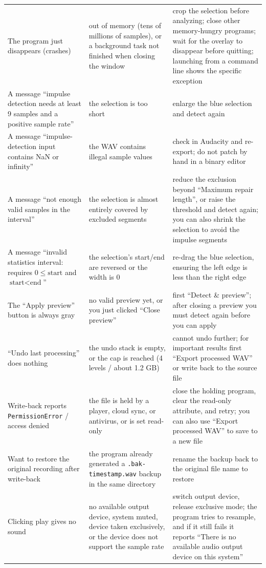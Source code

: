 \documentclass[UTF8,a4paper,12pt]{ctexart}
\begin{document}
{\begin{longtable}{@{}>{\raggedright\arraybackslash}p{}>{\raggedright\arraybackslash}p{}>{\raggedright\arraybackslash}p{}@{}}
The program just disappears (crashes) & out of memory (tens of millions of samples), or a background task not finished when closing the window & crop the selection before analyzing; close other memory-hungry programs; wait for the overlay to disappear before quitting; launching from a command line shows the specific exception \\
A message ``impulse detection needs at least 9 samples and a positive sample rate'' & the selection is too short & enlarge the blue selection and detect again \\
A message ``impulse-detection input contains NaN or infinity'' & the WAV contains illegal sample values & check in Audacity and re-export; do not patch by hand in a binary editor \\
A message ``not enough valid samples in the interval'' & the selection is almost entirely covered by excluded segments & reduce the exclusion beyond ``Maximum repair length'', or raise the threshold and detect again; you can also shrink the selection to avoid the impulse segments \\
A message ``invalid statistics interval: requires $0 \leq \text{start}$ and $\text{start} < \text{end}$'' & the selection's start/end are reversed or the width is 0 & re-drag the blue selection, ensuring the left edge is less than the right edge \\
The ``Apply preview'' button is always gray & no valid preview yet, or you just clicked ``Close preview'' & first ``Detect \& preview''; after closing a preview you must detect again before you can apply \\
``Undo last processing'' does nothing & the undo stack is empty, or the cap is reached (4 levels / about 1.2 GB) & cannot undo further; for important results first ``Export processed WAV'' or write back to the source file \\
Write-back reports \texttt{PermissionError} / access denied & the file is held by a player, cloud sync, or antivirus, or is set read-only & close the holding program, clear the read-only attribute, and retry; you can also use ``Export processed WAV'' to save to a new file \\
Want to restore the original recording after write-back & the program already generated a \texttt{.bak-timestamp.wav} backup in the same directory & rename the backup back to the original file name to restore \\
Clicking play gives no sound & no available output device, system muted, device taken exclusively, or the device does not support the sample rate & switch output device, release exclusive mode; the program tries to resample, and if it still fails it reports ``There is no available audio output device on this system'' \\

\end{longtable}}
\end{document}
